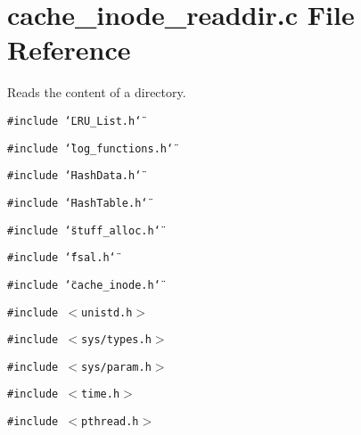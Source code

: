 \section{cache\_\-inode\_\-readdir.c File Reference}
\label{cache__inode__readdir_8c}
Reads the content of a directory. 

{\tt \#include \char`\"{}LRU\_\-List.h\char`\"{}}\par
{\tt \#include \char`\"{}log\_\-functions.h\char`\"{}}\par
{\tt \#include \char`\"{}Hash\-Data.h\char`\"{}}\par
{\tt \#include \char`\"{}Hash\-Table.h\char`\"{}}\par
{\tt \#include \char`\"{}stuff\_\-alloc.h\char`\"{}}\par
{\tt \#include \char`\"{}fsal.h\char`\"{}}\par
{\tt \#include \char`\"{}cache\_\-inode.h\char`\"{}}\par
{\tt \#include $<$unistd.h$>$}\par
{\tt \#include $<$sys/types.h$>$}\par
{\tt \#include $<$sys/param.h$>$}\par
{\tt \#include $<$time.h$>$}\par
{\tt \#include $<$pthread.h$>$}\par

